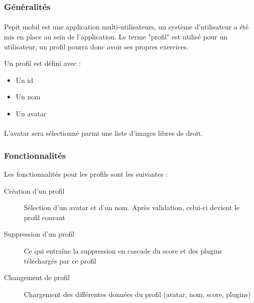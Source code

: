 \subsubsection{Généralités}
\paragraph{}Pepit mobil est une application multi-utilisateurs, un système d'utilisateur a été mis en place au sein de l'application. Le terme "profil" est utilisé pour un utilisateur, un profil pourra donc avoir ses propres exercices.

Un profil est défini avec :
\begin{itemize}
\item Un id
\item Un nom
\item Un avatar
\end{itemize}

\paragraph{}L'avatar sera sélectionné parmi une liste d'images libres de droit.

\subsubsection{Fonctionnalités}
Les fonctionnalités pour les profils sont les suivantes :
\begin{description}
\item[Création d'un profil] Sélection d'un avatar et d'un nom. Après validation, celui-ci devient le profil courant
\item[Suppression d'un profil] Ce qui entra\^{i}ne la suppression en cascade du score et des plugins téléchargés par ce profil
\item[Changement de profil] Chargement des différentes données du profil (avatar, nom, score, plugins)
\end{description}
